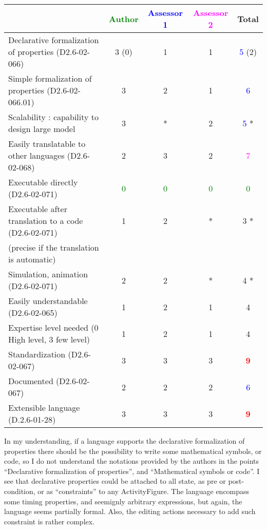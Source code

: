 \begin{tabular}{|l | c | c | c | c|}
\hline
& \textcolor{green}{Author} & \textcolor{blue}{Assessor 1} & \textcolor{magenta}{Assessor 2} & Total \\
\hline
Declarative formalization of properties (D2.6-02-066) & 3    (0) & 1    & 1    & \textcolor{blue}{5} (2) \\
\hline
Simple formalization of properties (D2.6-02-066.01) & 3    &  2 & 1    & \textcolor{blue}{6} \\
\hline
Scalability : capability to design large model & 3    & * & 2    & \textcolor{blue}{5} * \\
\hline
Easily translatable to other languages (D2.6-02-068) & 2    & 3    & 2    & \textcolor{magenta}{7} \\
\hline
Executable directly (D2.6-02-071) & \textcolor{green}{0} & \textcolor{green}{0} & \textcolor{green}{0} & \textcolor{green}{0} \\
\hline
Executable after translation to a code (D2.6-02-071) & 1    & 2    & * & 3   * \\
(precise if the translation is automatic) & & & & \\
\hline
Simulation, animation (D2.6-02-071) & 2    & 2    & * & 4   * \\
\hline
Easily understandable (D2.6-02-065) & 1    & 2    &  1 & 4    \\
\hline
Expertise level needed (0 High level, 3 few level) & 1    & 2    &  1 & 4    \\
\hline
Standardization (D2.6-02-067) & 3    & 3    & 3    & \textcolor{red}{\textbf{9}} \\
\hline
Documented (D2.6-02-067) & 2    & 2    & 2    & \textcolor{blue}{6} \\
\hline
Extensible language (D.2.6-01-28) & 3    & 3    & 3    & \textcolor{red}{\textbf{9}} \\
\hline
\end{tabular}

\begin{assessor1}
In my understanding, if a language supports the declarative formalization of properties there should be the possibility to write some mathematical symbols, or code, so I do not understand the notations provided by the authors in the points
"`Declarative formalization of properties"', and "`Mathematical symbols or code"'. I see that declarative properties could be attached to all state, as pre or post-condition, or as "`constraints"' to any ActivityFigure. The language encompass some timing properties, and seemignly arbitrary expressions, but again, the language seems partially formal. Also, the editing actions necessary to add such constraint is rather complex. 
\end{assessor1}

